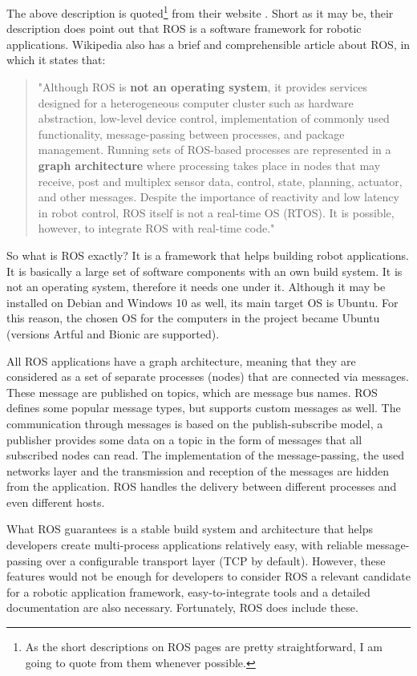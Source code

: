 The above description is quoted\footnote{As the short descriptions on ROS pages are pretty straightforward, I am going to quote from them whenever possible.} from their website \cite{ros}. Short as it may be, their description does point out that ROS is a software framework for robotic applications. Wikipedia also has a brief and comprehensible article \cite{wiki_ros} about ROS, in which it states that:

\begin{quote}
"Although ROS is \textbf{not an operating system}, it provides services designed for a heterogeneous computer cluster such as hardware abstraction, low-level device control, implementation of commonly used functionality, message-passing between processes, and package management. Running sets of ROS-based processes are represented in a \textbf{graph architecture} where processing takes place in nodes that may receive, post and multiplex sensor data, control, state, planning, actuator, and other messages. Despite the importance of reactivity and low latency in robot control, ROS itself is not a real-time OS (RTOS). It is possible, however, to integrate ROS with real-time code."
\end{quote}

So what is ROS exactly? It is a framework that helps building robot applications. It is basically a large set of software components with an own build system. It is not an operating system, therefore it needs one under it. Although it may be installed on Debian and Windows 10 as well, its main target OS is Ubuntu. For this reason, the chosen OS for the computers in the project became Ubuntu (versions Artful and Bionic are supported).

All ROS applications have a graph architecture, meaning that they are considered as a set of separate processes (nodes) that are connected via messages. These message are published on topics, which are message bus names. ROS defines some popular message types, but supports custom messages as well. The communication through messages is based on the publish-subscribe model, a publisher provides some data on a topic in the form of messages that all subscribed nodes can read. The implementation of the message-passing, the used networks layer and the transmission and reception of the messages are hidden from the application. ROS handles the delivery between different processes and even different hosts.

What ROS guarantees is a stable build system and architecture that helps developers create multi-process applications relatively easy, with reliable message-passing over a configurable transport layer (TCP by default). However, these features would not be enough for developers to consider ROS a relevant candidate for a robotic application framework, easy-to-integrate tools and a detailed documentation are also necessary. Fortunately, ROS does include these.

